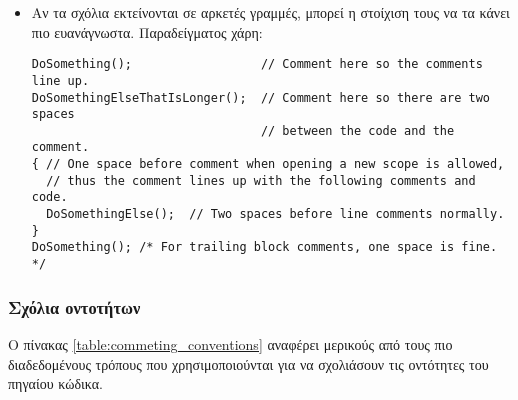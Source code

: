 \begin{itemize}
\item Αν τα σχόλια εκτείνονται σε αρκετές γραμμές, μπορεί η στοίχιση τους να τα κάνει πιο ευανάγνωστα. Παραδείγματος χάρη:

\begin{lstlisting}[style=cpp]
DoSomething();                  // Comment here so the comments line up.
DoSomethingElseThatIsLonger();  // Comment here so there are two spaces 
                                // between the code and the comment.
{ // One space before comment when opening a new scope is allowed,
  // thus the comment lines up with the following comments and code.
  DoSomethingElse();  // Two spaces before line comments normally.
}
DoSomething(); /* For trailing block comments, one space is fine. */
\end{lstlisting}

\end{itemize}

\subsubsection{Σχόλια οντοτήτων}

Ο πίνακας \ref{table:commeting_conventions} αναφέρει μερικούς από τους πιο διαδεδομένους τρόπους που χρησιμοποιούνται για να σχολιάσουν τις οντότητες του πηγαίου κώδικα.

